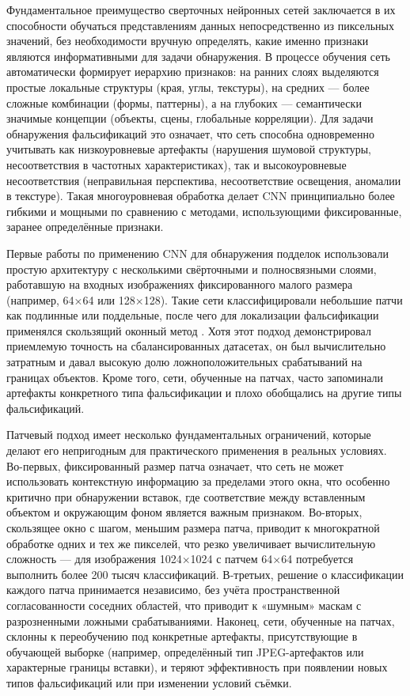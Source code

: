 Фундаментальное преимущество сверточных нейронных сетей заключается в их способности обучаться представлениям данных непосредственно из пиксельных значений, без необходимости вручную определять, какие именно признаки являются информативными для задачи обнаружения. В процессе обучения сеть автоматически формирует иерархию признаков: на ранних слоях выделяются простые локальные структуры (края, углы, текстуры), на средних — более сложные комбинации (формы, паттерны), а на глубоких — семантически значимые концепции (объекты, сцены, глобальные корреляции). Для задачи обнаружения фальсификаций это означает, что сеть способна одновременно учитывать как низкоуровневые артефакты (нарушения шумовой структуры, несоответствия в частотных характеристиках), так и высокоуровневые несоответствия (неправильная перспектива, несоответствие освещения, аномалии в текстуре). Такая многоуровневая обработка делает CNN принципиально более гибкими и мощными по сравнению с методами, использующими фиксированные, заранее определённые признаки.

Первые работы по применению CNN для обнаружения подделок использовали простую архитектуру с несколькими свёрточными и полносвязными слоями, работавшую на входных изображениях фиксированного малого размера (например, 64×64 или 128×128). Такие сети классифицировали небольшие патчи как подлинные или поддельные, после чего для локализации фальсификации применялся скользящий оконный метод \cite{24}. Хотя этот подход демонстрировал приемлемую точность на сбалансированных датасетах, он был вычислительно затратным и давал высокую долю ложноположительных срабатываний на границах объектов. Кроме того, сети, обученные на патчах, часто запоминали артефакты конкретного типа фальсификации и плохо обобщались на другие типы фальсификаций.

Патчевый подход имеет несколько фундаментальных ограничений, которые делают его непригодным для практического применения в реальных условиях. Во-первых, фиксированный размер патча означает, что сеть не может использовать контекстную информацию за пределами этого окна, что особенно критично при обнаружении вставок, где соответствие между вставленным объектом и окружающим фоном является важным признаком. Во-вторых, скользящее окно с шагом, меньшим размера патча, приводит к многократной обработке одних и тех же пикселей, что резко увеличивает вычислительную сложность — для изображения 1024×1024 с патчем 64×64 потребуется выполнить более 200 тысяч классификаций. В-третьих, решение о классификации каждого патча принимается независимо, без учёта пространственной согласованности соседних областей, что приводит к «шумным» маскам с разрозненными ложными срабатываниями. Наконец, сети, обученные на патчах, склонны к переобучению под конкретные артефакты, присутствующие в обучающей выборке (например, определённый тип JPEG-артефактов или характерные границы вставки), и теряют эффективность при появлении новых типов фальсификаций или при изменении условий съёмки.

